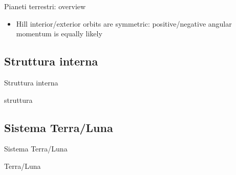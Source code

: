 \begin{wordonframe}{Pianeti terrestri: overview}
\begin{itemize}\item Hill interior/exterior orbits are symmetric: positive/negative angular momentum is equally likely\end{itemize}
\end{wordonframe}

\subsection{Struttura interna}

\begin{frame}{Struttura interna}

\end{frame}

\begin{wordonframe}{struttura}

\end{wordonframe}

\subsection{Sistema Terra/Luna}

\begin{frame}{Sistema Terra/Luna}

\end{frame}

\begin{wordonframe}{Terra/Luna}

\end{wordonframe}
